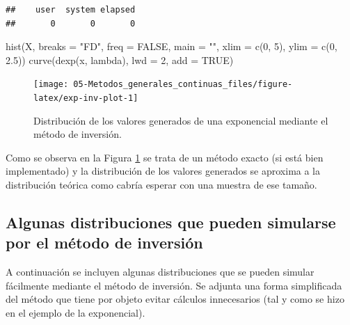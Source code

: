 \documentclass[
]{book}
\newenvironment{Shaded}{\begin{snugshade}}{\end{snugshade}}
\newcommand{\AttributeTok}[1]{\textcolor[rgb]{0.77,0.63,0.00}{#1}}
\newcommand{\ConstantTok}[1]{\textcolor[rgb]{0.00,0.00,0.00}{#1}}
\newcommand{\DecValTok}[1]{\textcolor[rgb]{0.00,0.00,0.81}{#1}}
\newcommand{\FloatTok}[1]{\textcolor[rgb]{0.00,0.00,0.81}{#1}}
\newcommand{\FunctionTok}[1]{\textcolor[rgb]{0.00,0.00,0.00}{#1}}
\newcommand{\NormalTok}[1]{#1}
\newcommand{\StringTok}[1]{\textcolor[rgb]{0.31,0.60,0.02}{#1}}
\theoremstyle{break}
\theoremstyle{definition}
\theoremstyle{definition}
\theoremstyle{definition}
\theoremstyle{definition}
\theoremstyle{remark}
\begin{document}
\begin{verbatim}
##    user  system elapsed 
##       0       0       0
\end{verbatim}

\begin{Shaded}
\begin{Highlighting}[]
\FunctionTok{hist}\NormalTok{(X, }\AttributeTok{breaks =} \StringTok{"FD"}\NormalTok{, }\AttributeTok{freq =} \ConstantTok{FALSE}\NormalTok{, }
        \AttributeTok{main =} \StringTok{""}\NormalTok{, }\AttributeTok{xlim =} \FunctionTok{c}\NormalTok{(}\DecValTok{0}\NormalTok{, }\DecValTok{5}\NormalTok{), }\AttributeTok{ylim =} \FunctionTok{c}\NormalTok{(}\DecValTok{0}\NormalTok{, }\FloatTok{2.5}\NormalTok{))}
\FunctionTok{curve}\NormalTok{(}\FunctionTok{dexp}\NormalTok{(x, lambda), }\AttributeTok{lwd =} \DecValTok{2}\NormalTok{, }\AttributeTok{add =} \ConstantTok{TRUE}\NormalTok{)}
\end{Highlighting}
\end{Shaded}

\begin{figure}[!htb]

{\centering \texttt{[image: 05-Metodos\_generales\_continuas\_files/figure-latex/exp-inv-plot-1]} 

}

\caption{Distribución de los valores generados de una exponencial mediante el método de inversión.}\label{fig:exp-inv-plot}
\end{figure}

Como se observa en la Figura \ref{fig:exp-inv-plot} se trata de un método exacto (si está bien implementado) y la distribución de los valores generados se aproxima a la distribución teórica como cabría esperar con una muestra de ese tamaño.

\hypertarget{algunas-distribuciones-que-pueden-simularse-por-el-muxe9todo-de-inversiuxf3n}{%
\subsection{Algunas distribuciones que pueden simularse por el método de inversión}\label{algunas-distribuciones-que-pueden-simularse-por-el-muxe9todo-de-inversiuxf3n}}

A continuación se incluyen algunas distribuciones que se pueden simular
fácilmente mediante el método de inversión. Se adjunta una forma
simplificada del método que tiene por objeto evitar cálculos
innecesarios (tal y como se hizo en el ejemplo de la exponencial).
\end{document}

